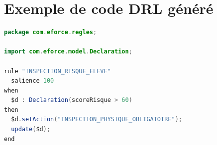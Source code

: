 \chapter{Exemple de code DRL g\'en\'er\'e}
\label{annexe:drl}


\begin{lstlisting}[language=Java, caption={Exemple de r\`egle DRL g\'en\'er\'ee \`a partir d'une phrase en langage naturel}, label={lst:drl-exemple}]
package com.eforce.regles;

import com.eforce.model.Declaration;

rule "INSPECTION_RISQUE_ELEVE"
  salience 100
when
  $d : Declaration(scoreRisque > 60)
then
  $d.setAction("INSPECTION_PHYSIQUE_OBLIGATOIRE");
  update($d);
end
\end{lstlisting}
